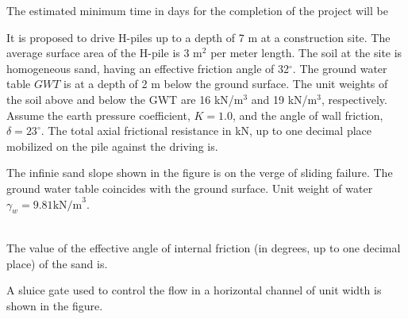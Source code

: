 The estimated minimum time in days for the completion of the project will be

\item
It is proposed to drive H-piles up to a depth of 7 m at a construction site. The average surface area of the H-pile is 3 m$^2$ per meter length. The soil at the site is homogeneous sand, having an effective friction angle of 32$^\circ$. The ground water table $GWT$ is at a depth of 2 m below the ground surface. The unit weights of the soil above and below the GWT are 16 kN/m$^3$ and 19 kN/m$^3$, respectively. Assume the earth pressure coefficient, $K = 1.0$, and the angle of wall friction, $\delta = 23^\circ$. The total axial frictional resistance in kN, up to one decimal place mobilized on the pile against the driving is.

\item
The infinie sand slope shown in the figure is on the verge of sliding failure. The ground water table coincides with the ground surface. Unit weight of water $\gamma_w = 9.81 \text{kN/m}^3$.
\begin{figure}[!ht]
\centering
{}%

\label{fig:my_label}
\end{figure}\\
The value of the effective angle of internal friction (in degrees, up to one decimal place) of the sand is.

\item
A sluice gate used to control the flow in a horizontal channel of unit width is shown in the figure.\\

